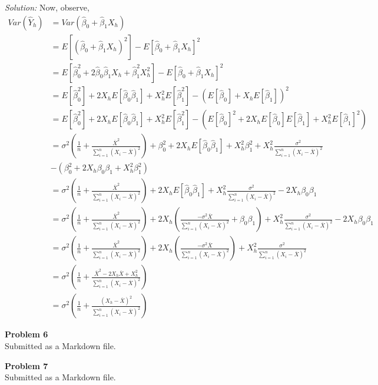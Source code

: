 \documentclass{article}
\newenvironment{problem}[2][Problem]
    { \begin{mdframed}[backgroundcolor=gray!20] \textbf{#1 #2} \\}
    {  \end{mdframed}}
\newenvironment{solution}
    {\textit{Solution:}}
    {}
\begin{document}
\begin{solution}
Now, observe, 
\begin{align*}
Var(\hat Y_h) &= Var(\hat \beta_0 + \hat \beta_1 X_h) \\
&= E[(\hat \beta_0 + \hat \beta_1 X_h)^2] - E[\hat \beta_0 + \hat \beta_1 X_h]^2 \\
&= E[\hat \beta_0^2 + 2 \hat \beta_0 \hat \beta_1 X_h + \hat \beta_1^2 X_h^2] - E[\hat \beta_0 + \hat \beta_1 X_h]^2 \\
&= E[\hat \beta_0^2] + 2 X_h E[\hat \beta_0 \hat \beta_1]  + X_h^2 E[ \hat \beta_1^2] - \left ( E[\hat \beta_0] + X_h E[\hat \beta_1 ] \right) ^2 \\
&= E[\hat \beta_0^2] + 2 X_h E[\hat \beta_0 \hat \beta_1]  + X_h^2 E[ \hat \beta_1^2] - \left ( E[\hat \beta_0]^2 + 2 X_h E[\hat \beta_0] E[\hat \beta_1 ]  + X_h^2 E[\hat \beta_1 ]^2 \right)  \\
&= \sigma^2 
\left ( \frac{1}{n}  + \frac{\overline X^2}{\sum_{i = 1}^n (X_i - \overline X)^2}\right) + \beta_0^2 + 2 X_h E[\hat \beta_0 \hat \beta_1]  + X_h^2 \beta_1^2 + X_h^2 \frac{\sigma^2}{ \sum_{i = 1}^n (X_i - \overline X)^2} \\
&- \left (\beta_0^2  + 2 X_h \beta_0  \beta_1  + X_h^2 \beta_1^2 \right)  \\
&= \sigma^2 
\left ( \frac{1}{n}  + \frac{\overline X^2}{\sum_{i = 1}^n (X_i - \overline X)^2}\right) + 2 X_h E[\hat \beta_0 \hat \beta_1]  + X_h^2 \frac{\sigma^2}{ \sum_{i = 1}^n (X_i - \overline X)^2} - 2 X_h \beta_0  \beta_1  \\
&= \sigma^2 
\left ( \frac{1}{n}  + \frac{\overline X^2}{\sum_{i = 1}^n (X_i - \overline X)^2}\right) + 2 X_h\left ( \frac{-\sigma^2 \overline{X}}{\sum_{i = 1}^n (X_i - \overline X)^2}  + \beta_0 \beta_1 \right)  + X_h^2 \frac{\sigma^2}{ \sum_{i = 1}^n (X_i - \overline X)^2} - 2 X_h \beta_0  \beta_1  \\
&= \sigma^2 
\left ( \frac{1}{n}  + \frac{\overline X^2}{\sum_{i = 1}^n (X_i - \overline X)^2}\right) + 2 X_h\left ( \frac{-\sigma^2 \overline{X}}{\sum_{i = 1}^n (X_i - \overline X)^2}  \right)  + X_h^2 \frac{\sigma^2}{ \sum_{i = 1}^n (X_i - \overline X)^2}  \\
&= \sigma^2 
\left ( \frac{1}{n}  + \frac{\overline X^2 - 2 X_h \overline{X} + X_h^2}{\sum_{i = 1}^n (X_i - \overline X)^2}\right) \\
&= \sigma^2 \left ( \frac{1}{n} + \frac{(X_h - \overline{X})^2}{\sum_{i = 1}^n (X_i - \overline{X})^2} \right)
\end{align*}

\end{solution}

\begin{problem}{6}
Submitted as a  Markdown file. 
\end{problem}

\begin{problem}{7}
Submitted as a  Markdown file. 
\end{problem}
\end{document}
